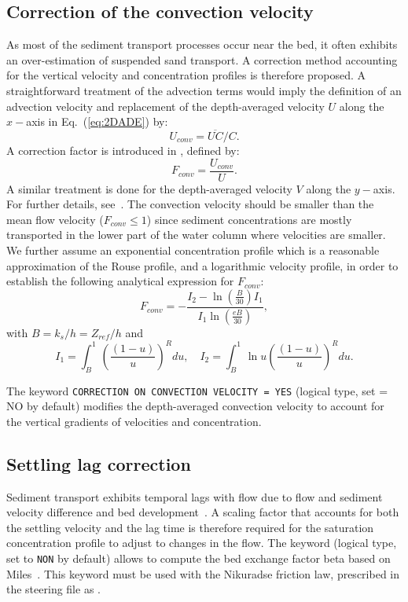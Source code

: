 \subsection{Correction of the convection velocity}
As most of the sediment transport processes occur near the bed, it often exhibits an over-estimation of suspended sand transport.
A correction method accounting for the vertical velocity and concentration profiles is therefore proposed. A straightforward treatment of the advection terms would imply the
definition of an advection velocity and replacement of the depth-averaged
velocity $U$ along the $x-$axis in Eq.~(\ref{eq:2DADE}) by:
\begin{equation*}
U_{conv} = \overline{UC}/C.
\end{equation*}
A correction factor is introduced in \gaia, defined by:
\begin{equation*}
F_{conv} =\frac{U_{conv}}{U}.
\end{equation*}
A similar treatment is done for the depth-averaged velocity $V$ along the $y-$axis. For further details, see~\cite{Huybrechts}.
The convection velocity should be smaller than the mean flow velocity ($F_{conv} \leq 1$) since sediment concentrations are mostly transported in the lower part of the water column where velocities are smaller. We further
assume an exponential concentration profile which is a reasonable
approximation of the Rouse profile, and a logarithmic velocity profile, in
order to establish the following analytical expression for $F_{conv}$:
\begin{equation*}
F_{conv} =-\frac{I_2 - \ln\left(\frac{B}{30}\right) I_1}{I_1 \ln\left(
\frac{eB}{30}\right)},
\end{equation*}
with $B=k_s/h = Z_{ref}/h$ and
\begin{equation*}
I_1 =\int_B^1\left(\frac{(1-u)}{u}\right)^R du,\quad I_2 = \int_B^1 \ln u \left(\frac{(1-u)}{u} \right)^R du.
\end{equation*}

The keyword \texttt{CORRECTION ON CONVECTION VELOCITY = YES} (logical type, set {\ttfamily = NO} by default) modifies the depth-averaged convection velocity to account for the vertical gradients of velocities and concentration.

\subsection{Settling lag correction}
Sediment transport exhibits temporal lags with flow due to flow and sediment velocity difference and bed development~\cite{wu2007computational, Miles96}. A scaling factor that accounts for both the settling velocity and the lag time is therefore required for the saturation concentration profile to adjust to changes in the flow.
The keyword  (logical type, set to \texttt{NON} by default) allows to compute the bed exchange factor beta based on Miles~\cite{Miles96}. This keyword must be used with the Nikuradse friction law, prescribed in the  steering file as .

